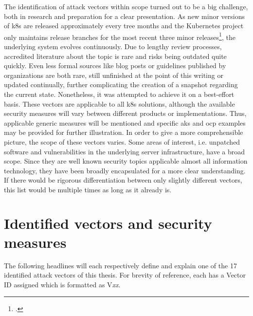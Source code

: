 The identification of attack vectors within scope turned out to be a big challenge, both in research and preparation for a clear presentation. 
As new minor versions of \gls{k8s} are released approximately every tree months and the Kubernetes project only maintains release branches for the most recent three minor releases\footcite[][, section 'Supported versions']{k8sSupport}, the underlying system evolves continuously. Due to lengthy review processes, accredited literature about the topic is rare and risks being outdated quite quickly. Even less formal sources like blog posts or guidelines published by organizations are both rare, still unfinished at the point of this writing or updated continually, further complicating the creation of a snapshot regarding the current state. Nonetheless, it was attempted to achieve it on a best-effort basis.
These vectors are applicable to all \gls{k8s} solutions, although the available security measures will vary between different products or implementations. Thus, applicable  generic measures will be mentioned and specific \gls{aks} and \gls{ocp} examples may be provided for further illustration.
In order to give a more comprehensible picture, the scope of these vectors varies. Some areas of interest, i.e. unpatched software and vulnerabilities in the underlying server  infrastructure, have a broad scope. Since they are well known security topics applicable almost all information technology, they have been broadly encapsulated for a more clear understanding. If there would be rigorous differentiation between only slightly different vectors, this list would be multiple times as long as it already is.


\section{Identified vectors and security measures} \label{vectorIdentify}
The following headlines will each respectively define and explain one of the 17 identified attack vectors of this thesis. For brevity of reference, each has a Vector ID assigned which is formatted as V\textit{xx}.

	
